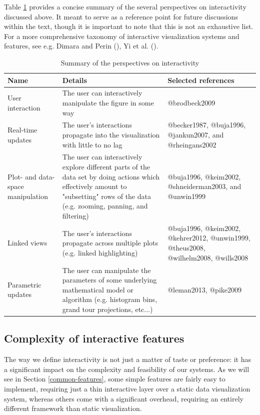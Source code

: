 \documentclass[
]{book}
\theoremstyle{definition}
\theoremstyle{definition}
\theoremstyle{definition}
\theoremstyle{definition}
\theoremstyle{remark}
\begin{document}
Table \ref{tab:definitions} provides a concise summary of the several perspectives on interactivity discussed above. It meant to serve as a reference point for future discussions within the text, though it is important to note that this is not an exhaustive list. For a more comprehensive taxonomy of interactive visualization systems and features, see e.g. Dimara and Perin (), Yi et al. ().

\begin{table}
\centering
\caption{\label{tab:definitions}Summary of the perspectives on interactivity}
\centering
\begin{tabular}[t]{l|l|l}
\hline
Name & Details & Selected references\\
\hline
User interaction & The user can interactively manipulate the figure in some way & @brodbeck2009\\
\hline
Real-time updates & The user's interactions propagate into the visualization with little to no lag & @becker1987, @buja1996, @jankun2007, and @rheingans2002\\
\hline
Plot- and data-space manipulation & The user can interactively explore different parts of the data set by doing actions which effectively amount to "subsetting" rows of the data (e.g. zooming, panning, and filtering) & @buja1996, @keim2002, @shneiderman2003, and @unwin1999\\
\hline
Linked views & The user's interactions propagate across multiple plots (e.g. linked highlighting) & @buja1996, @keim2002, @kehrer2012, @unwin1999, @theus2008, @wilhelm2008, @wills2008\\
\hline
Parametric updates & The user can manipulate the parameters of some underlying mathematical model or algorithm (e.g. histogram bins, grand tour projections, etc...) & @leman2013, @pike2009\\
\hline
\end{tabular}
\end{table}

\subsection{Complexity of interactive features}\label{complexity-of-features}

The way we define interactivity is not just a matter of taste or preference: it has a significant impact on the complexity and feasibility of our systems. As we will see in Section \ref{common-features}, some simple features are fairly easy to implement, requiring just a thin interactive layer over a static data visualization system, whereas others come with a significant overhead, requiring an entirely different framework than static visualization.
\end{document}

